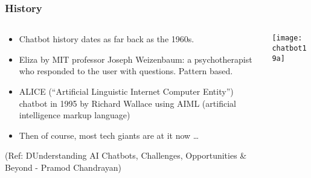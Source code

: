 




\begin{frame}[fragile]\frametitle{History}

    \begin{columns}
    \begin{column}[t]{0.5\linewidth}
	\begin{itemize}
	\item Chatbot history dates as far back as the 1960s.
	\item Eliza by MIT professor Joseph Weizenbaum: a psychotherapist who responded to the user with questions. Pattern based.
	\item ALICE (“Artificial Linguistic Internet Computer Entity”) chatbot in 1995 by Richard Wallace using AIML (artificial intelligence markup language)
	\item Then of course, most tech giants are at it now \ldots
	\end{itemize}
	
\tiny{(Ref: DUnderstanding AI Chatbots, Challenges, Opportunities \& Beyond - Pramod Chandrayan)}

	
    \end{column}
    \begin{column}[t]{0.5\linewidth}
\begin{center}
\texttt{[image: chatbot19a]}

\end{center}
    \end{column}
  \end{columns}
  
  

	
\end{frame}

